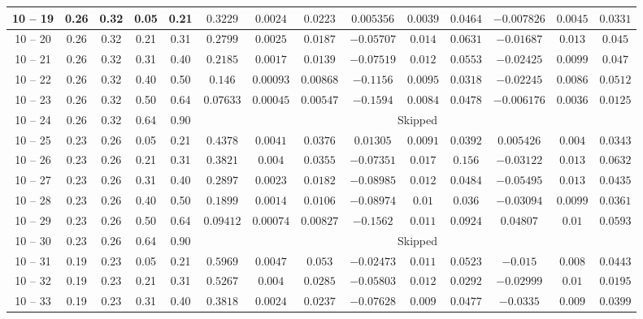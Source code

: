 \begin{longtable}{|*{14}{c|}}
\hline
10 -- 19 & 0.26 & 0.32 & 0.05 & 0.21 & $0.3229$ & $0.0024$ & $0.0223$ & $0.005356$ & $0.0039$ & $0.0464$ & $-0.007826$ & $0.0045$ & $0.0331$ \\
\hline
10 -- 20 & 0.26 & 0.32 & 0.21 & 0.31 & $0.2799$ & $0.0025$ & $0.0187$ & $-0.05707$ & $0.014$ & $0.0631$ & $-0.01687$ & $0.013$ & $0.045$ \\
\hline
10 -- 21 & 0.26 & 0.32 & 0.31 & 0.40 & $0.2185$ & $0.0017$ & $0.0139$ & $-0.07519$ & $0.012$ & $0.0553$ & $-0.02425$ & $0.0099$ & $0.047$ \\
\hline
10 -- 22 & 0.26 & 0.32 & 0.40 & 0.50 & $0.146$ & $0.00093$ & $0.00868$ & $-0.1156$ & $0.0095$ & $0.0318$ & $-0.02245$ & $0.0086$ & $0.0512$ \\
\hline
10 -- 23 & 0.26 & 0.32 & 0.50 & 0.64 & $0.07633$ & $0.00045$ & $0.00547$ & $-0.1594$ & $0.0084$ & $0.0478$ & $-0.006176$ & $0.0036$ & $0.0125$ \\
\hline
10 -- 24 & 0.26 & 0.32 & 0.64 & 0.90 & \multicolumn{9}{c|}{Skipped} \\
\hline
10 -- 25 & 0.23 & 0.26 & 0.05 & 0.21 & $0.4378$ & $0.0041$ & $0.0376$ & $0.01305$ & $0.0091$ & $0.0392$ & $0.005426$ & $0.004$ & $0.0343$ \\
\hline
10 -- 26 & 0.23 & 0.26 & 0.21 & 0.31 & $0.3821$ & $0.004$ & $0.0355$ & $-0.07351$ & $0.017$ & $0.156$ & $-0.03122$ & $0.013$ & $0.0632$ \\
\hline
10 -- 27 & 0.23 & 0.26 & 0.31 & 0.40 & $0.2897$ & $0.0023$ & $0.0182$ & $-0.08985$ & $0.012$ & $0.0484$ & $-0.05495$ & $0.013$ & $0.0435$ \\
\hline
10 -- 28 & 0.23 & 0.26 & 0.40 & 0.50 & $0.1899$ & $0.0014$ & $0.0106$ & $-0.08974$ & $0.01$ & $0.036$ & $-0.03094$ & $0.0099$ & $0.0361$ \\
\hline
10 -- 29 & 0.23 & 0.26 & 0.50 & 0.64 & $0.09412$ & $0.00074$ & $0.00827$ & $-0.1562$ & $0.011$ & $0.0924$ & $0.04807$ & $0.01$ & $0.0593$ \\
\hline
10 -- 30 & 0.23 & 0.26 & 0.64 & 0.90 & \multicolumn{9}{c|}{Skipped} \\
\hline
10 -- 31 & 0.19 & 0.23 & 0.05 & 0.21 & $0.5969$ & $0.0047$ & $0.053$ & $-0.02473$ & $0.011$ & $0.0523$ & $-0.015$ & $0.008$ & $0.0443$ \\
\hline
10 -- 32 & 0.19 & 0.23 & 0.21 & 0.31 & $0.5267$ & $0.004$ & $0.0285$ & $-0.05803$ & $0.012$ & $0.0292$ & $-0.02999$ & $0.01$ & $0.0195$ \\
\hline
10 -- 33 & 0.19 & 0.23 & 0.31 & 0.40 & $0.3818$ & $0.0024$ & $0.0237$ & $-0.07628$ & $0.009$ & $0.0477$ & $-0.0335$ & $0.009$ & $0.0399$ \\

\end{longtable}
